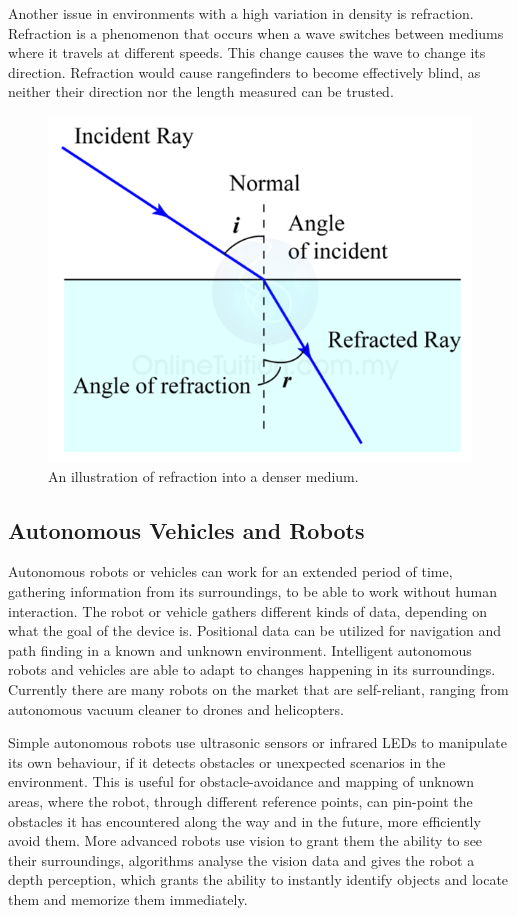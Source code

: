 Another issue in environments with a high variation in density is refraction. Refraction is a phenomenon that occurs when a wave switches between mediums where it travels at different speeds. This change causes the wave to change its direction. %
Refraction would cause rangefinders to become effectively blind, as neither their direction nor the length measured can be trusted.

\begin{figure}[H]
	\centering
	\includegraphics[width=.4\linewidth]{images/refraction.png}
	\caption{An illustration of refraction into a denser medium.}
	\label{fig:refractionIMG}
\end{figure}

\clearpage
\subsection{Autonomous Vehicles and Robots}

Autonomous robots or vehicles can work for an extended period of time, gathering information from its surroundings, to be able to work without human interaction. The robot or vehicle gathers different kinds of data, depending on what the goal of the device is. Positional data can be utilized for navigation and path finding in a known and unknown environment. Intelligent autonomous robots and vehicles are able to adapt to changes happening in its surroundings.
Currently there are many robots on the market that are self-reliant, ranging from autonomous vacuum cleaner to drones and helicopters\cite{autonomousbasic}.

Simple autonomous robots use ultrasonic sensors or infrared LEDs to manipulate its own behaviour, if it detects obstacles or unexpected scenarios in the environment. This is useful for obstacle-avoidance and mapping of unknown areas, where the robot, through different reference points, can pin-point the obstacles it has encountered along the way and in the future, more efficiently avoid them.
More advanced robots use vision to grant them the ability to see their surroundings, algorithms analyse the vision data and gives the robot a depth perception, which grants the ability to instantly identify objects and locate them and memorize them immediately\cite{obstacles}.

